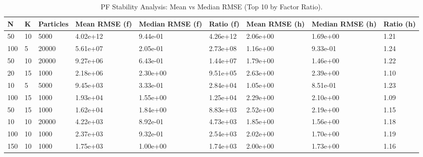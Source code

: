 \begin{table}
\caption{PF Stability Analysis: Mean vs Median RMSE (Top 10 by Factor Ratio).}
\label{tab:pf_stability}
\begin{tabular}{lllllllll}
\toprule
N & K & Particles & Mean RMSE (f) & Median RMSE (f) & Ratio (f) & Mean RMSE (h) & Median RMSE (h) & Ratio (h) \\
\midrule
50 & 10 & 5000 & 4.02e+12 & 9.44e-01 & 4.26e+12 & 2.06e+00 & 1.69e+00 & 1.21 \\
100 & 5 & 20000 & 5.61e+07 & 2.05e-01 & 2.73e+08 & 1.16e+00 & 9.33e-01 & 1.24 \\
50 & 10 & 20000 & 9.27e+06 & 6.43e-01 & 1.44e+07 & 1.79e+00 & 1.46e+00 & 1.22 \\
20 & 15 & 1000 & 2.18e+06 & 2.30e+00 & 9.51e+05 & 2.63e+00 & 2.39e+00 & 1.10 \\
10 & 5 & 5000 & 9.45e+03 & 3.33e-01 & 2.84e+04 & 1.05e+00 & 8.51e-01 & 1.23 \\
100 & 15 & 1000 & 1.93e+04 & 1.55e+00 & 1.25e+04 & 2.29e+00 & 2.10e+00 & 1.09 \\
50 & 15 & 1000 & 1.62e+04 & 1.84e+00 & 8.83e+03 & 2.52e+00 & 2.19e+00 & 1.15 \\
10 & 10 & 20000 & 4.22e+03 & 8.92e-01 & 4.73e+03 & 1.85e+00 & 1.56e+00 & 1.18 \\
100 & 10 & 1000 & 2.37e+03 & 9.32e-01 & 2.54e+03 & 2.02e+00 & 1.70e+00 & 1.19 \\
150 & 10 & 1000 & 1.75e+03 & 1.00e+00 & 1.74e+03 & 2.00e+00 & 1.73e+00 & 1.16 \\
\bottomrule
\end{tabular}
\end{table}
